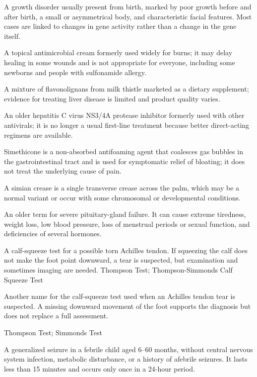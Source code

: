  A growth disorder usually present from birth, marked by poor growth before and after birth, a small or asymmetrical body, and characteristic facial features. Most cases are linked to changes in gene activity rather than a change in the gene itself.

 A topical antimicrobial cream formerly used widely for burns; it may delay healing in some wounds and is not appropriate for everyone, including some newborns and people with sulfonamide allergy.

 A mixture of flavonolignans from milk thistle marketed as a dietary supplement; evidence for treating liver disease is limited and product quality varies.

 An older hepatitis C virus NS3/4A protease inhibitor formerly used with other antivirals; it is no longer a usual first-line treatment because better direct-acting regimens are available.

 Simethicone is a non-absorbed antifoaming agent that coalesces gas bubbles in the gastrointestinal tract and is used for symptomatic relief of bloating; it does not treat the underlying cause of pain.

 A simian crease is a single transverse crease across the palm, which may be a normal variant or occur with some chromosomal or developmental conditions.

 An older term for severe pituitary-gland failure. It can cause extreme tiredness, weight loss, low blood pressure, loss of menstrual periods or sexual function, and deficiencies of several hormones.

 A calf-squeeze test for a possible torn Achilles tendon. If squeezing the calf does not make the foot point downward, a tear is suspected, but examination and sometimes imaging are needed.
\synonyms
Thompson Test; Thompson-Simmonds Calf Squeeze Test

 Another name for the calf-squeeze test used when an Achilles tendon tear is suspected. A missing downward movement of the foot supports the diagnosis but does not replace a full assessment.

\synonyms
Thompson Test; Simmonds Test

 A generalized seizure in a febrile child aged 6--60 months, without central nervous system infection, metabolic disturbance, or a history of afebrile seizures. It lasts less than 15 minutes and occurs only once in a 24-hour period.

